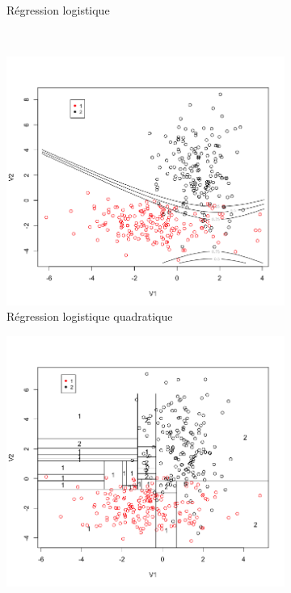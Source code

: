 \documentclass[a4paper,10pt]{report}
\begin{document}
\begin{figure}[H]
\begin{subfigure}[b]{0.45\linewidth}
		\caption{\small Régression logistique}
		\label{fig:front-decision-synth-2-reg-log}%
	\end{subfigure}\\%
	\begin{subfigure}[b]{0.45\linewidth}
		\centering
		\captionsetup{justification=centering, margin=1cm}
		\includegraphics[width=1\linewidth]{img/front-decision-synth-2-reg-log-quad}
		\caption{\small Régression logistique quadratique}
		\label{fig:front-decision-synth-2-reg-log-quad}%
	\end{subfigure}%
	\begin{subfigure}[b]{0.45\linewidth}
		\centering
		\captionsetup{justification=centering, margin=1cm}
		\includegraphics[width=1\linewidth]{img/front-decision-synth-2-tree}

\end{subfigure}
\end{figure}
\end{document}
